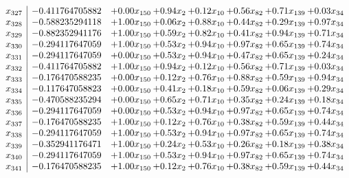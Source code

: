 \documentclass[8pt]{article}
\begin{document}
\[\begin{array}{c| c c@{\hskip 2pt} c@{\hskip 2pt} c@{\hskip 2pt} c@{\hskip 2pt} c@{\hskip 2pt} c@{\hskip 2pt} }
 x_{327}   &  -0.411764705882 & +  0.00 x_{150} & +  0.94 x_{2} & +  0.12 x_{10} & +  0.56 x_{82} & +  0.71 x_{139} & +  0.03 x_{34}\\
 x_{328}   &  -0.588235294118 & +  1.00 x_{150} & +  0.06 x_{2} & +  0.88 x_{10} & +  0.44 x_{82} & +  0.29 x_{139} & +  0.97 x_{34}\\
 x_{329}   &  -0.882352941176 & +  1.00 x_{150} & +  0.59 x_{2} & +  0.82 x_{10} & +  0.41 x_{82} & +  0.94 x_{139} & +  0.71 x_{34}\\
 x_{330}   &  -0.294117647059 & +  1.00 x_{150} & +  0.53 x_{2} & +  0.94 x_{10} & +  0.97 x_{82} & +  0.65 x_{139} & +  0.74 x_{34}\\
 x_{331}   &  -0.294117647059 & +  0.00 x_{150} & +  0.53 x_{2} & +  0.94 x_{10} & +  0.47 x_{82} & +  0.65 x_{139} & +  0.24 x_{34}\\
 x_{332}   &  -0.411764705882 & +  1.00 x_{150} & +  0.94 x_{2} & +  0.12 x_{10} & +  0.56 x_{82} & +  0.71 x_{139} & +  0.03 x_{34}\\
 x_{333}   &  -0.176470588235 & +  0.00 x_{150} & +  0.12 x_{2} & +  0.76 x_{10} & +  0.88 x_{82} & +  0.59 x_{139} & +  0.94 x_{34}\\
 x_{334}   &  -0.117647058823 & +  0.00 x_{150} & +  0.41 x_{2} & +  0.18 x_{10} & +  0.59 x_{82} & +  0.06 x_{139} & +  0.29 x_{34}\\
 x_{335}   &  -0.470588235294 & +  0.00 x_{150} & +  0.65 x_{2} & +  0.71 x_{10} & +  0.35 x_{82} & +  0.24 x_{139} & +  0.18 x_{34}\\
 x_{336}   &  -0.294117647059 & +  0.00 x_{150} & +  0.53 x_{2} & +  0.94 x_{10} & +  0.97 x_{82} & +  0.65 x_{139} & +  0.74 x_{34}\\
 x_{337}   &  -0.176470588235 & +  1.00 x_{150} & +  0.12 x_{2} & +  0.76 x_{10} & +  0.38 x_{82} & +  0.59 x_{139} & +  0.44 x_{34}\\
 x_{338}   &  -0.294117647059 & +  1.00 x_{150} & +  0.53 x_{2} & +  0.94 x_{10} & +  0.97 x_{82} & +  0.65 x_{139} & +  0.74 x_{34}\\
 x_{339}   &  -0.352941176471 & +  1.00 x_{150} & +  0.24 x_{2} & +  0.53 x_{10} & +  0.26 x_{82} & +  0.18 x_{139} & +  0.38 x_{34}\\
 x_{340}   &  -0.294117647059 & +  1.00 x_{150} & +  0.53 x_{2} & +  0.94 x_{10} & +  0.97 x_{82} & +  0.65 x_{139} & +  0.74 x_{34}\\
 x_{341}   &  -0.176470588235 & +  1.00 x_{150} & +  0.12 x_{2} & +  0.76 x_{10} & +  0.38 x_{82} & +  0.59 x_{139} & +  0.44 x_{34}\\

\end{array}\]
\end{document}
